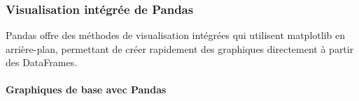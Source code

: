 \documentclass[11pt]{article}
\begin{document}
    \begin{center}
    \end{center}
    { \hspace*{\fill} \\}
    
    \begin{center}
    \end{center}
    { \hspace*{\fill} \\}
    
    \begin{center}
    \end{center}
    { \hspace*{\fill} \\}
    
    \subsubsection{Visualisation intégrée de
Pandas}\label{visualisation-intuxe9gruxe9e-de-pandas}

Pandas offre des méthodes de visualisation intégrées qui utilisent
matplotlib en arrière-plan, permettant de créer rapidement des
graphiques directement à partir des DataFrames.

\paragraph{Graphiques de base avec
Pandas}\label{graphiques-de-base-avec-pandas}
\end{document}
